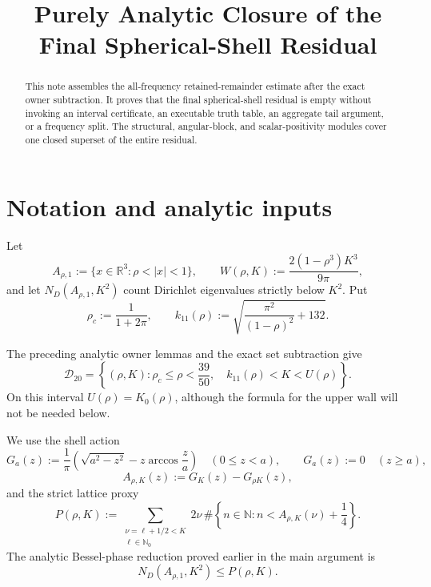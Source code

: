 \documentclass[11pt]{article}
\title{Purely Analytic Closure of the Final Spherical-Shell Residual}
\author{}
\date{}
\newcommand{\ND}{N_D}
\newcommand{\Dc}{\mathcal D_{20}}
\begin{document}
\maketitle

\begin{abstract}
This note assembles the all-frequency retained-remainder estimate after the
exact owner subtraction. It proves that the final spherical-shell residual
is empty without invoking an interval certificate, an executable truth
table, an aggregate tail argument, or a frequency split.  The structural,
angular-block, and scalar-positivity modules cover one closed superset of the
entire residual.
\end{abstract}

\section{Notation and analytic inputs}

Let
\[
 A_{\rho,1}:=\{x\in\mathbb R^3:\rho<|x|<1\},
 \qquad
 W(\rho,K):=\frac{2(1-\rho^3)K^3}{9\pi},
\]
and let \(\ND(A_{\rho,1},K^2)\) count Dirichlet eigenvalues strictly below
\(K^2\). Put
\[
 \rho_c:=\frac1{1+2\pi},
 \qquad
 k_{11}(\rho):=
 \sqrt{\frac{\pi^2}{(1-\rho)^2}+132}.
\]

The preceding analytic owner lemmas and the exact set subtraction give
\begin{equation}
 \Dc=
 \left\{(\rho,K):
 \rho_c\leq\rho<\frac{39}{50},\quad
 k_{11}(\rho)<K<U(\rho)\right\}.
 \label{eq:D20}
\end{equation}
On this interval \(U(\rho)=K_0(\rho)\), although the formula for the upper
wall will not be needed below.

We use the shell action
\[
 G_a(z):=\frac1\pi
 \left(\sqrt{a^2-z^2}-z\arccos\frac za\right)
 \quad(0\leq z<a),
 \qquad G_a(z):=0\quad(z\geq a),
\]
\[
 A_{\rho,K}(z):=G_K(z)-G_{\rho K}(z),
\]
and the strict lattice proxy
\begin{equation}
 P(\rho,K):=
 \sum_{\substack{\nu=\ell+1/2<K\\\ell\in\mathbb N_0}}
 2\nu\,
 \#\left\{n\in\mathbb N:
 n<A_{\rho,K}(\nu)+\frac14\right\}.
 \label{eq:P}
\end{equation}
The analytic Bessel-phase reduction proved earlier in the main argument is
\begin{equation}
 \ND(A_{\rho,1},K^2)\leq P(\rho,K).
 \label{eq:phase}
\end{equation}
\end{document}
